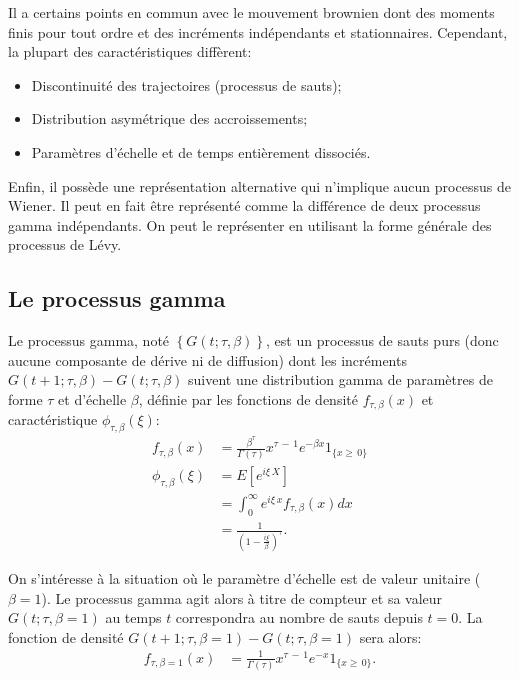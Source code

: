 Il a certains points en commun avec le mouvement brownien dont des
moments finis pour tout ordre et des incréments indépendants et
stationnaires. Cependant, la plupart des caractéristiques diffèrent:
\begin{itemize}
\item Discontinuité des trajectoires (processus de sauts);
\item Distribution asymétrique des accroissements;
\item Paramètres d'échelle et de temps entièrement dissociés.
\end{itemize}

Enfin, il possède une représentation alternative qui n'implique aucun
processus de Wiener. Il peut en fait être représenté comme la
différence de deux processus gamma indépendants. On peut le
représenter en utilisant la forme générale des processus de Lévy.

\subsection{Le processus gamma}
\label{sec:processusgamma}

Le processus gamma, noté $\left\{G(t;\tau,\beta)\right\}$, est un
processus de sauts purs (donc aucune composante de dérive ni de
diffusion) dont les incréments $G(t+1;\tau,\beta) - G(t;\tau,\beta)$
suivent une distribution gamma de paramètres de forme $\tau$ et
d'échelle $\beta$, définie par les fonctions de densité
$f_{\tau,\beta}(x)$ et caractéristique $\phi_{\tau,\beta}(\xi)$:
\begin{align}
  f_{\tau,\beta}(x) &= \frac{\beta^\tau}{\Gamma(\tau)} x^{\tau \,-\, 1} e^{- \beta x } 1_{\lbrace x\geq\,0 \rbrace} \label{eq:densitegamma} \\
  \phi_{\tau,\beta}(\xi) &= E\left[e^{i\xi\,X} \right] \nonumber\\
  &= \int_{0}^{\infty} e^{i\xi\,x} f_{\tau,\beta}(x) dx \nonumber\\
  &=
  \frac{1}{\left(1-\frac{i\xi}{\beta}\right)^{\tau}} \label{eq:fncaractgamma}.
\end{align}

On s'intéresse à la situation où le paramètre d'échelle est de valeur
unitaire ($\beta=1$). Le processus gamma agit alors à titre de
compteur et sa valeur $G(t;\tau,\beta=1)$ au temps $t$ correspondra au
nombre de sauts depuis $t=0$. La fonction de densité
$G(t+1;\tau,\beta=1) - G(t;\tau,\beta=1)$ sera alors:
\begin{align}
  f_{\tau,\beta=1}(x) &= \frac{1}{\Gamma(\tau)} x^{\tau \,-\, 1} e^{- x} 1_{\lbrace x\geq\,0 \rbrace}. \label{eq:densitegamma1}
\end{align}

